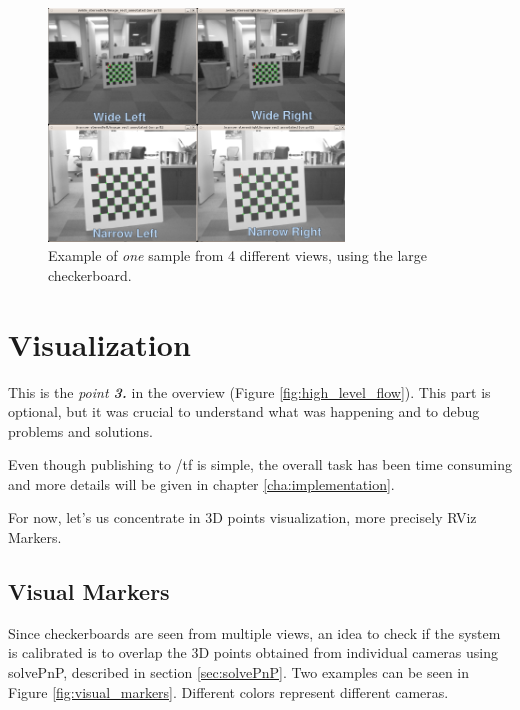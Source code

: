\begin{figure}[!htbp]
 \centering
 \includegraphics[width=0.7\textwidth]{images/data_collection01.png}
 \caption{Example of \textit{one} sample from 4 different views, using the large checkerboard.}
 \label{fig:data_collection01}
\end{figure}




\section{Visualization}
\label{sec:visualization}

This is the \textit{point \textbf{3.}} in the overview (Figure \ref{fig:high_level_flow}). This part is optional, but it was crucial to understand what was happening and to debug problems and solutions.

Even though publishing to /tf is simple, the overall task has been time consuming and more details will be given in chapter \ref{cha:implementation}. %

For now, let's us concentrate in 3D points visualization, more precisely RViz Markers.

\subsection{Visual Markers}
\label{sec:visual_markers}

Since checkerboards are seen from multiple views, an idea to check if the system is calibrated is to overlap the 3D points obtained from individual cameras using solvePnP, described in section \ref{sec:solvePnP}. Two examples can be seen in Figure \ref{fig:visual_markers}. Different colors represent different cameras.


